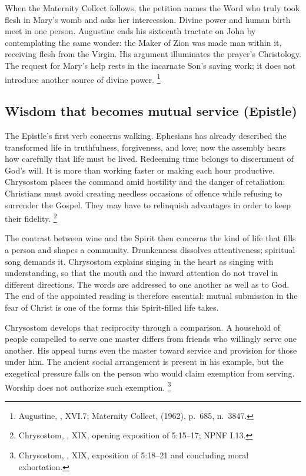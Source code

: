 When the Maternity Collect follows, the petition names the Word who truly
took flesh in Mary's womb and asks her intercession. Divine power and
human birth meet in one person. Augustine ends his sixteenth tractate on
John by contemplating the same wonder: the Maker of Zion was made man
within it, receiving flesh from the Virgin. His argument illuminates the
prayer's Christology. The request for Mary's help rests in the incarnate
Son's saving work; it does not introduce another source of divine power.
\footnote{Augustine, , XVI.7; Maternity Collect,
 (1962), p.~685, n.~3847.}

\subsection{Wisdom that becomes mutual service (Epistle)}
The Epistle's first verb concerns walking. Ephesians has already described
the transformed life in truthfulness, forgiveness, and love; now the
assembly hears how carefully that life must be lived. Redeeming time
belongs to discernment of God's will. It is more than working faster or
making each hour productive. Chrysostom places the command amid hostility
and the danger of retaliation: Christians must avoid creating needless
occasions of offence while refusing to surrender the Gospel. They may have
to relinquish advantages in order to keep their fidelity.
\footnote{Chrysostom, , XIX, opening exposition
of 5:15--17; NPNF I.13.}

The contrast between wine and the Spirit then concerns the kind of life
that fills a person and shapes a community. Drunkenness dissolves
attentiveness; spiritual song demands it. Chrysostom explains singing in
the heart as singing with understanding, so that the mouth and the inward
attention do not travel in different directions. The words are addressed
to one another as well as to God. The end of the appointed reading is
therefore essential: mutual submission in the fear of Christ is one of
the forms this Spirit-filled life takes.

Chrysostom develops that reciprocity through a comparison. A household of
people compelled to serve one master differs from friends who willingly
serve one another. His appeal turns even the master toward service and
provision for those under him. The ancient social arrangement is present
in his example, but the exegetical pressure falls on the person who would
claim exemption from serving. Worship does not authorize such exemption.
\footnote{Chrysostom, , XIX, exposition of
5:18--21 and concluding moral exhortation.}

